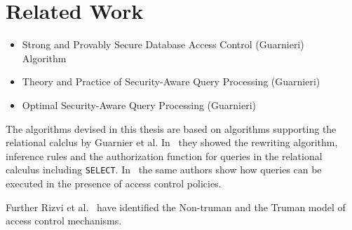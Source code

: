 \section{Related Work}

\begin{itemize}
	\item Strong and Provably Secure Database Access Control (Guarnieri) \\
	Algorithm
	\item Theory and Practice of Security-Aware Query Processing (Guarnieri) 
	\item Optimal Security-Aware Query Processing (Guarnieri)
\end{itemize}

The algorithms devised in this thesis are based on algorithms supporting the relational calclus by Guarnier et al. In~\cite{guarnieri2016strong} they showed the rewriting algorithm, inference rules and the authorization function for queries in the relational calculus including \texttt{SELECT}.
%
In~\cite{guarnieri2014optimal} the same authors show how queries can be executed in the presence of access control policies.

Further Rizvi et al.~\cite{rizvi2004extending} have identified the Non-truman and the Truman model of access control mechanisms.